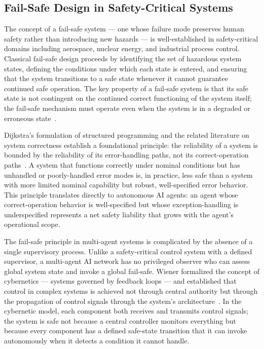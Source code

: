 \subsection{Fail-Safe Design in Safety-Critical Systems}
\label{sec:failsafe}

The concept of a fail-safe system --- one whose failure mode preserves human safety rather than introducing new hazards --- is well-established in safety-critical domains including aerospace, nuclear energy, and industrial process control. Classical fail-safe design proceeds by identifying the set of hazardous system states, defining the conditions under which each state is entered, and ensuring that the system transitions to a safe state whenever it cannot guarantee continued safe operation. The key property of a fail-safe system is that its safe state is not contingent on the continued correct functioning of the system itself; the fail-safe mechanism must operate even when the system is in a degraded or erroneous state~\cite{dijkstra1982,wiener1948}.

Dijkstra's formulation of structured programming and the related literature on system correctness establish a foundational principle: the reliability of a system is bounded by the reliability of its error-handling paths, not its correct-operation paths~\cite{dijkstra1982}. A system that functions correctly under nominal conditions but has unhandled or poorly-handled error modes is, in practice, less safe than a system with more limited nominal capability but robust, well-specified error behavior. This principle translates directly to autonomous AI agents: an agent whose correct-operation behavior is well-specified but whose exception-handling is underspecified represents a net safety liability that grows with the agent's operational scope.

The fail-safe principle in multi-agent systems is complicated by the absence of a single supervisory process. Unlike a safety-critical control system with a defined supervisor, a multi-agent AI network has no privileged observer who can assess global system state and invoke a global fail-safe. Wiener formalized the concept of cybernetics --- systems governed by feedback loops --- and established that control in complex systems is achieved not through central authority but through the propagation of control signals through the system's architecture~\cite{wiener1948}. In the cybernetic model, each component both receives and transmits control signals; the system is safe not because a central controller monitors everything but because every component has a defined safe-state transition that it can invoke autonomously when it detects a condition it cannot handle.

